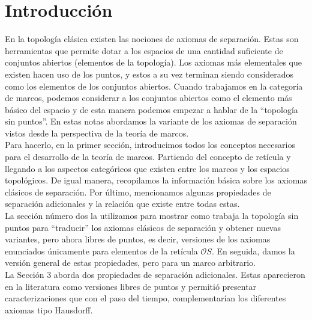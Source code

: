 \documentclass{comunicaciones}
\begin{document}


\maketitle

\section*{Introducción}\label{Introduccion}

\noindent 
En la topología clásica existen las nociones de axiomas de separación. Estas son herramientas que permite dotar a los espacios de una cantidad suficiente de conjuntos abiertos (elementos de la topología). Los axiomas más elementales que existen hacen uso de los puntos, y estos a su vez terminan siendo considerados como los elementos de los conjuntos abiertos. Cuando trabajamos en la categoría de marcos, podemos considerar a los conjuntos abiertos como el elemento más básico del espacio y de esta manera podemos empezar a hablar de la ``topología sin puntos''. En estas notas abordamos la variante de los axiomas de separación vistos desde la perspectiva de la teoría de marcos. \\

Para hacerlo, en la primer sección, introducimos todos los conceptos necesarios para el desarrollo de la teoría de marcos. Partiendo del concepto de retícula y llegando a los aspectos categóricos que existen entre los marcos y los espacios topológicos. De igual manera, recopilamos la información básica sobre los axiomas clásicos de separación. Por último, mencionamos algunas propiedades de separación adicionales y la relación que existe entre todas estas.\\

La sección número dos la utilizamos para mostrar como trabaja la topología sin puntos para ``traducir'' los axiomas clásicos de separación y obtener nuevas variantes, pero ahora libres de puntos, es decir, versiones de los axiomas enunciados únicamente para elementos de la retícula $\mathcal{O}S$. En seguida, damos la versión general de estas propiedades, pero para un marco arbitrario.\\

La Sección 3 aborda dos propiedades de separación adicionales. Estas aparecieron en la literatura como versiones libres de puntos y permitió presentar caracterizaciones que con el paso del tiempo, complementarían los diferentes axiomas tipo Hausdorff.\\
\end{document}
